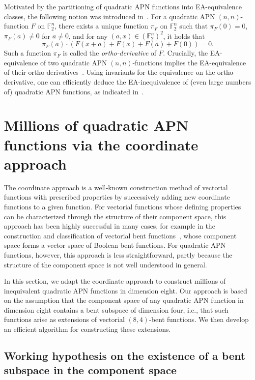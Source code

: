 \documentclass{amsart}[11pt]
\theoremstyle{plain}
\theoremstyle{definition}
\numberwithin{theorem}{section}
\numberwithin{equation}{section}
\numberwithin{table}{section}
\numberwithin{figure}{section}
\numberwithin{algorithm}{section}
\def\F{\mathbb F}
\begin{document}
Motivated by the partitioning of quadratic APN functions into EA-equivalence classes, the following notion was introduced in~\cite{CanteautCP2022}.
For a quadratic APN $(n,n)$-function $F$ on $\F_2^n$, there exists a unique function $\pi_F$ on $\F_2^n$ such that $\pi_F(0) = 0$, $\pi_F(a) \neq 0$ for $a \neq 0$, and for any $(a, x) \in (\mathbb{F}_2^n)^2$, it holds that
$$
\pi_F(a) \cdot (F(x + a) + F(x) + F(a) + F(0) ) = 0.
$$
Such a function $\pi_F$ is called the \emph{ortho-derivative} of $F$. Crucially, the EA-equivalence of two quadratic APN $(n,n)$-functions implies the EA-equivalence of their ortho-derivatives~\cite[Proposition 36]{CanteautCP2022}. Using invariants for the equivalence on the ortho-derivative, one can efficiently deduce the  EA-inequivalence of (even large numbers of) quadratic APN functions, as indicated in~\cite{DBLP:journals/corr/abs-2009-07204,YuPerrin2024}.


\section{Millions of quadratic APN functions via the coordinate approach}\label{sec:millions}
The coordinate approach is a well-known construction method of vectorial functions with prescribed properties by successively adding new coordinate functions to a given function. For vectorial functions whose defining properties can be characterized through the structure of their component space, this approach has been highly successful in many cases, for example in the construction and classification of vectorial bent functions~\cite{Arshad_PhD_Thesis,PolujanPott2022BFA,PolujanP21}, whose component space forms a vector space of Boolean bent functions. For quadratic APN functions, however, this approach is less straightforward, partly because the structure of the component space is not well understood in general.

In this section, we adapt the coordinate approach to construct millions of inequivalent quadratic APN functions in dimension eight. Our approach is based on the assumption that the component space of any quadratic APN function in dimension eight contains a bent subspace of dimension four, i.e., that such functions arise as extensions of vectorial $(8,4)$-bent functions. We then develop an efficient algorithm for constructing these extensions.

\subsection{Working hypothesis on the existence of a bent subspace in the component space}\label{sec:hypothesis}
\end{document}
